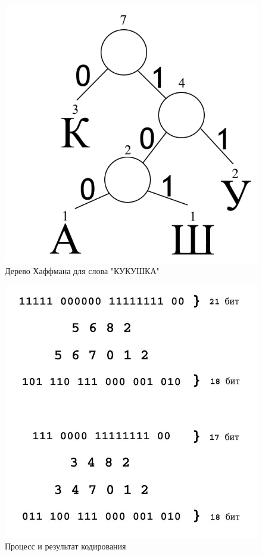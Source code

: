 \begin{figure}[H]
	\begin{center}
		\includegraphics[scale=0.7]{../pics/Huffman/huffman.png}
		\caption{Дерево Хаффмана для слова "КУКУШКА"}
		\label{pic:huff}
	\end{center}
\end{figure}



\begin{figure}[H]
	\begin{center}
		\includegraphics[scale=0.4]{../pics/RLE/example.jpg}
		\caption{Процесс и результат кодирования}
		\label{pic:rle}
	\end{center}
\end{figure}	



